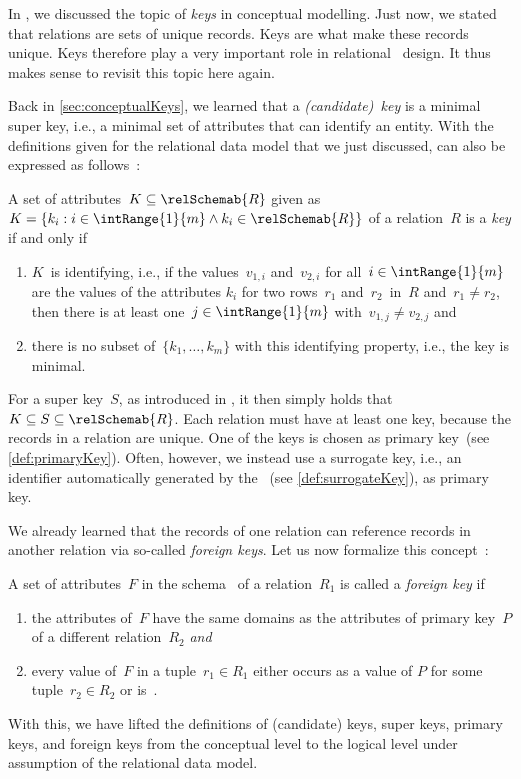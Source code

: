 %
%
In , we discussed the topic of \emph{keys} in conceptual modelling.
Just now, we stated that relations are sets of unique records.
Keys are what make these records unique.
Keys therefore play a very important role in relational \db\ design.
It thus makes sense to revisit this topic here again.

Back in \cref{sec:conceptualKeys}, we learned that a \emph{(candidate)~key} is a minimal super key, i.e., a minimal set of attributes that can identify an entity.
With the definitions given for the relational data model that we just discussed,  can also be expressed as follows~\cite{SS2005EIDDDFDB:SDLDUTRDM}:%
%
\begin{definition}[Key]%
\label{def:key2}%
A set of attributes~$K\subseteq\relSchemab{R}$ given as~$K=\{k_i:i\in\intRange{1}{m} \land k_i\in\relSchemab{R}\}$ of a relation~$R$ is a \emph{key} if and only if%
%
\begin{enumerate}%
%
\item $K$~is identifying, i.e., if the values~$v_{1,i}$ and~$v_{2,i}$ for all~$i\in\intRange{1}{m}$ are the values of the attributes $k_i$ for two rows~$r_1$ and~$r_2$~in~$R$ and~$r_1\neq r_2$, then there is at least one~$j\in\intRange{1}{m}$ with~$v_{1,j}\neq v_{2,j}$ and%
%
\item there is no subset of~$\{k_1, \dots, k_m\}$ with this identifying property, i.e., the key is minimal.%
%
\end{enumerate}%
\end{definition}%
%
For a super key~$S$, as introduced in , it then simply holds that~$K\subseteq S\subseteq\relSchemab{R}$.
Each relation must have at least one key, because the records in a relation are unique.
One of the keys is chosen as primary key~(see \cref{def:primaryKey}).
Often, however, we instead use a surrogate key, i.e., an identifier automatically generated by the \dbms~(see \cref{def:surrogateKey}), as primary key.

We already learned that the records of one relation can reference records in another relation via so-called \emph{foreign keys}.
Let us now formalize this concept~\cite{SS2005EIDDDFDB:SDLDUTRDM}:%
%
\begin{definition}%
\label{def:foreignKey}%
A set of attributes~$F$ in the schema~ of a relation~$R_1$ is called a \emph{foreign key} if%
\begin{enumerate}%
\item the attributes of~$F$ have the same domains as the attributes of primary key~$P$ of a different relation~$R_2$ \emph{and}%
\item every value of~$F$ in a tuple~$r_1\in R_1$ either occurs as a value of $P$ for some tuple~$r_2\in R_2$ or is~.%
\end{enumerate}%
\end{definition}%
%
With this, we have lifted the definitions of (candidate) keys, super keys, primary keys, and foreign keys from the conceptual level to the logical level under assumption of the relational data model.%
%
\endhsection%
